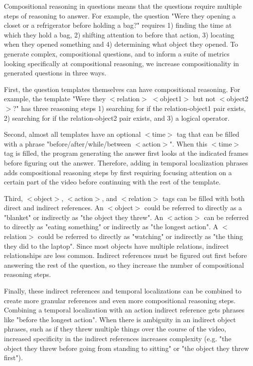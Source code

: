 Compositional reasoning in questions means that the questions require multiple steps of reasoning to answer. For example, the question "Were they opening a closet or a refrigerator before holding a bag?" requires 1) finding the time at which they hold a bag, 2) shifting attention to before that action, 3) locating when they opened something and 4) determining what object they opened. To generate complex, compositional questions, and to inform a suite of metrics looking specifically at compositional reasoning, we increase compositionality in generated questions in three ways.

First, the question templates themselves can have compositional reasoning. For example, the template "Were they $<$relation$>$ $<$object1$>$ but not $<$object2$>$?" has three reasoning steps 1) searching for if the relation-object1 pair exists, 2) searching for if the relation-object2 pair exists, and 3) a logical operator. 

Second, almost all templates have an optional $<$time$>$ tag that can be filled with a phrase "before/after/while/between $<$action$>$". When this $<$time$>$ tag is filled, the program generating the answer first looks at the indicated frames before figuring out the answer. Therefore, adding in temporal localization phrases adds compositional reasoning steps by first requiring focusing attention on a certain part of the video before continuing with the rest of the template.

Third, $<$object$>$, $<$action$>$, and $<$relation$>$ tags can be filled with both direct and indirect references. An $<$object$>$ could be referred to directly as a "blanket" or indirectly as "the object they threw". An $<$action$>$ can be referred to directly as "eating something" or indirectly as "the longest action". A $<$relation$>$ could be referred to directly as "watching" or indirectly as "the thing they did to the laptop". Since most objects have multiple relations, indirect relationships are less common. Indirect references must be figured out first before answering the rest of the question, so they increase the number of compositional reasoning steps.

Finally, these indirect references and temporal localizations can be combined to create more granular references and even more compositional reasoning steps. Combining a temporal localization with an action indirect reference gets phrases like "before the longest action". When there is ambiguity in an indirect object phrases, such as if they threw multiple things over the course of the video, increased specificity in the indirect references increases complexity (e.g. "the object they threw before going from standing to sitting" or "the object they threw first").

